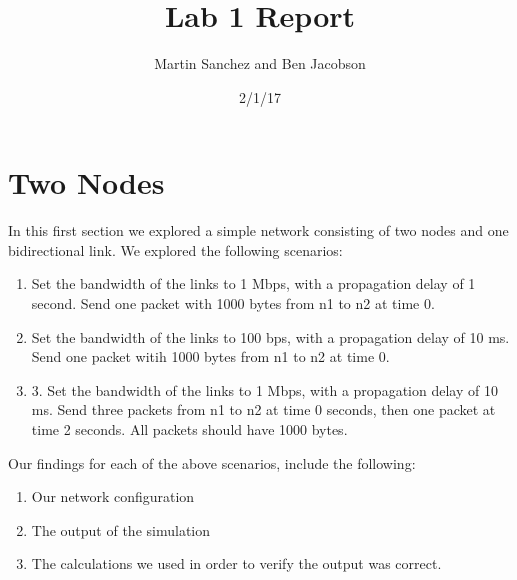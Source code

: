 \documentclass[fleqn,11pt]{article}
\begin{document}
\lstset{
  language=Python,
  basicstyle=\small,          %
  keywordstyle=\bfseries,
  identifierstyle=,           %
  commentstyle=,              %
  stringstyle=\ttfamily,      %
  showstringspaces=false,     %
  numbers=left,
  numberstyle=\tiny,
  numbersep=5pt,
  frame=tb,
}

\title{Lab 1 Report}

\author{Martin Sanchez and Ben Jacobson}

\date{2/1/17}

\maketitle

\section{Two Nodes}

In this first section we explored a simple network consisting of two nodes and one bidirectional link. We explored the following scenarios:
\begin{enumerate}

\item Set the bandwidth of the links to 1 Mbps, with a propagation delay of 1 second. Send one packet with 1000 bytes from n1 to n2 at time 0.

\item Set the bandwidth of the links to 100 bps, with a propagation delay of 10 ms. Send one packet witih 1000 bytes from n1 to n2 at time 0.

\item 3. Set the bandwidth of the links to 1 Mbps, with a propagation delay of 10 ms. Send three packets from n1 to n2 at time 0 seconds, then one packet at time 2 seconds. All packets should have 1000 bytes.

\end{enumerate}
Our findings for each of the above scenarios, include the following:
\begin{enumerate}

\item Our network configuration

\item The output of the simulation

\item The calculations we used in order to verify the output was correct.

\end{enumerate}
\end{document}
